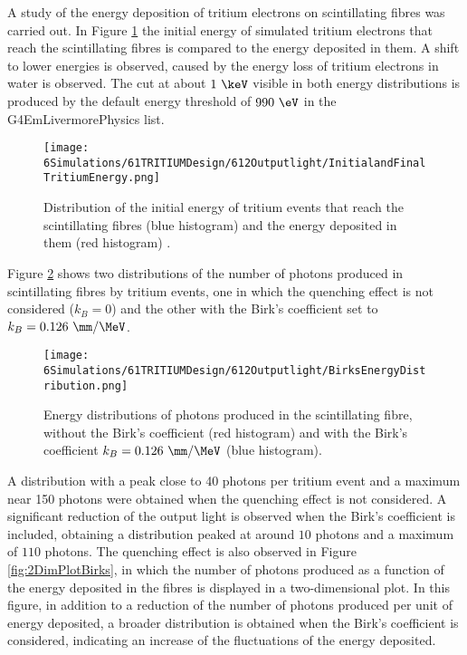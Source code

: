 A study of the energy deposition of tritium electrons on scintillating fibres was carried out. In Figure \ref{fig:InitialFinalTritiumEnergy} the initial energy of simulated tritium electrons that reach the scintillating fibres is compared to the energy deposited in them. A shift to lower energies is observed, caused by the energy loss of tritium electrons in water is observed. The cut at about $1~\keV$ visible in both energy distributions is produced by the default energy threshold of $990~\eV$ in the G4EmLivermorePhysics list.
\begin{figure}[h]
\centering
\texttt{[image: 6Simulations/61TRITIUMDesign/612Outputlight/InitialandFinalTritiumEnergy.png]}
\caption{Distribution of the initial energy of tritium events that reach the scintillating fibres (blue histogram) and the energy deposited in them (red histogram) \cite{SimulationPaperCarlos}.\label{fig:InitialFinalTritiumEnergy}}
\end{figure}
Figure \ref{fig:BirksEffectinEnergyDistribution} shows two distributions of the number of photons produced in scintillating fibres by tritium events, one in which the quenching effect is not considered ($k_B=0$) and the other with the Birk's coefficient set to $k_B=0.126~\mm/\MeV$.
\begin{figure}[h]
\centering
\texttt{[image: 6Simulations/61TRITIUMDesign/612Outputlight/BirksEnergyDistribution.png]}
\caption{Energy distributions of photons produced in the scintillating fibre, without the Birk's coefficient (red histogram) and with the Birk's coefficient $k_B=0.126~\mm/\MeV$ \newline (blue histogram)\cite{SimulationPaperCarlos}.\label{fig:BirksEffectinEnergyDistribution}}
\end{figure}  
A distribution with a peak close to 40 photons per tritium event and a maximum near 150 photons were obtained when the quenching effect is not considered. A significant reduction of the output light is observed when the Birk's coefficient is included, obtaining a distribution peaked at around $10$ photons and a maximum of $110$ photons. The quenching effect is also observed in Figure \ref{fig:2DimPlotBirks}, in which the number of photons produced  as a function of the energy deposited in the fibres is displayed in a two-dimensional plot. In this figure, in addition to a reduction of the number of photons produced per unit of energy deposited, a broader distribution is obtained when the Birk's coefficient is considered, indicating an increase of the fluctuations of the energy deposited.

